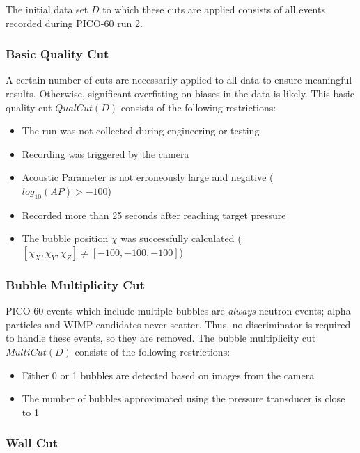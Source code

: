 \documentclass[10pt]{article}
\begin{document}
The initial data set $D$ to which these cuts are applied consists of all events recorded during PICO-60 run 2.

\subsubsection{Basic Quality Cut}

A certain number of cuts are necessarily applied to all data to ensure meaningful results. Otherwise, significant overfitting on biases in the data is likely. This basic quality cut $QualCut(D)$ consists of the following restrictions:

\begin{itemize}
    \item The run was not collected during engineering or testing
    \item Recording was triggered by the camera
    \item Acoustic Parameter is not erroneously large and negative ($log_{10}(AP)>-100$)
    \item Recorded more than 25 seconds after reaching target pressure
    \item The bubble position $\chi$ was successfully calculated ($[\chi_{X}, \chi_{Y}, \chi_{Z}]\neq[-100, -100, -100]$)
\end{itemize}

\subsubsection{Bubble Multiplicity Cut}

PICO-60 events which include multiple bubbles are \textit{always} neutron events; alpha particles and WIMP candidates never scatter. Thus, no discriminator is required to handle these events, so they are removed. The bubble multiplicity cut $MultiCut(D)$ consists of the following restrictions:

\begin{itemize}
    \item Either 0 or 1 bubbles are detected based on images from the camera
    \item The number of bubbles approximated using the pressure transducer is close to 1
\end{itemize}

\subsubsection{Wall Cut}
\end{document}

